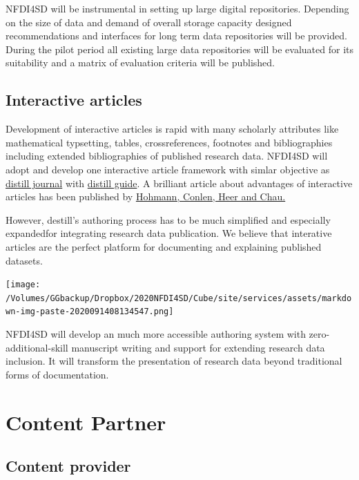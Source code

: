 \documentclass[
  english,
  paper=a4,
  oneside,captions=tableheading
]{scrbook}
\begin{document}
NFDI4SD will be instrumental in setting up large digital repositories.
Depending on the size of data and demand of overall storage capacity
designed recommendations and interfaces for long term data repositories
will be provided. During the pilot period all existing large data
repositories will be evaluated for its suitability and a matrix of
evaluation criteria will be published.

\hypertarget{interactive-articles}{%
\subsection{Interactive articles}\label{interactive-articles}}

Development of interactive articles is rapid with many scholarly
attributes like mathematical typsetting, tables, crossreferences,
footnotes and bibliographies including extended bibliographies of
published research data. NFDI4SD will adopt and develop one interactive
article framework with simlar objective as
\href{https://distill.pub/journal/}{distill journal} with
\href{https://distill.pub/guide/}{distill guide}. A brilliant article
about advantages of interactive articles has been published by
\href{https://distill.pub/2020/communicating-with-interactive-articles/}{Hohmann,
Conlen, Heer and Chau.}

However, destill's authoring process has to be much simplified and
especially expandedfor integrating research data publication. We believe
that interative articles are the perfect platform for documenting and
explaining published datasets.

\texttt{[image: /Volumes/GGbackup/Dropbox/2020NFDI4SD/Cube/site/services/assets/markdown-img-paste-2020091408134547.png]}

NFDI4SD will develop an much more accessible authoring system with
zero-additional-skill manuscript writing and support for extending
research data inclusion. It will transform the presentation of research
data beyond traditional forms of documentation.

\hypertarget{content-partner}{%
\section{Content Partner}\label{content-partner}}

\hypertarget{content-provider}{%
\subsection{Content provider}\label{content-provider}}
\end{document}
